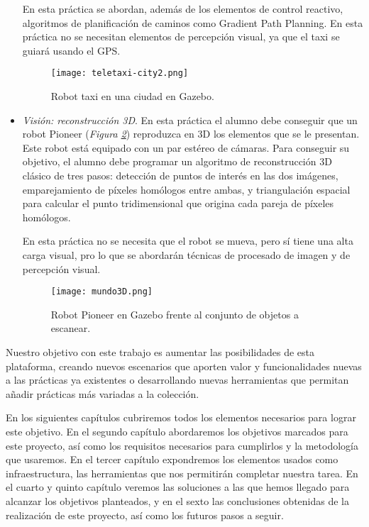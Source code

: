 \begin{itemize}
	En esta práctica se abordan, además de los elementos de control reactivo, algoritmos de planificación de caminos como Gradient Path Planning. En esta práctica no se necesitan elementos de percepción visual, ya que el taxi se guiará usando el GPS.

\begin{figure}[h]
	\centering\texttt{[image: teletaxi-city2.png]}
	\caption{Robot taxi en una ciudad en Gazebo.}
	\label{fig:teletaxi}
\end{figure}
	
	\item \textit{Visión: reconstrucción 3D}. En esta práctica el alumno debe conseguir que un robot Pioneer (\textit{Figura \ref{fig:mundo3D}}) reproduzca en 3D los elementos que se le presentan. Este robot está equipado con un par estéreo de cámaras. Para conseguir su objetivo, el alumno debe programar un algoritmo de reconstrucción 3D clásico de tres pasos: detección de puntos de interés en las dos imágenes, emparejamiento de píxeles homólogos entre ambas, y triangulación espacial para calcular el punto tridimensional que origina cada pareja de píxeles homólogos.
	
	En esta práctica no se necesita que el robot se mueva, pero sí tiene una alta carga visual, pro lo que se abordarán técnicas de procesado de imagen y de percepción visual.
	
\begin{figure}[h]
	\centering\texttt{[image: mundo3D.png]}
	\caption{Robot Pioneer en Gazebo frente al conjunto de objetos a escanear.}
	\label{fig:mundo3D}
\end{figure}

\end{itemize}

Nuestro objetivo con este trabajo es aumentar las posibilidades de esta plataforma, creando nuevos escenarios que aporten valor y funcionalidades nuevas a las prácticas ya existentes o desarrollando nuevas herramientas que permitan añadir prácticas más variadas a la colección.

En los siguientes capítulos cubriremos todos los elementos necesarios para lograr este objetivo. En el segundo capítulo abordaremos los objetivos marcados para este proyecto, así como los requisitos necesarios para cumplirlos y la metodología que usaremos. En el tercer capítulo expondremos los elementos usados como infraestructura, las herramientas que nos permitirán completar nuestra tarea. En el cuarto y quinto capítulo veremos las soluciones a las que hemos llegado para alcanzar los objetivos planteados, y en el sexto las conclusiones obtenidas de la realización de este proyecto, así como los futuros pasos a seguir.

